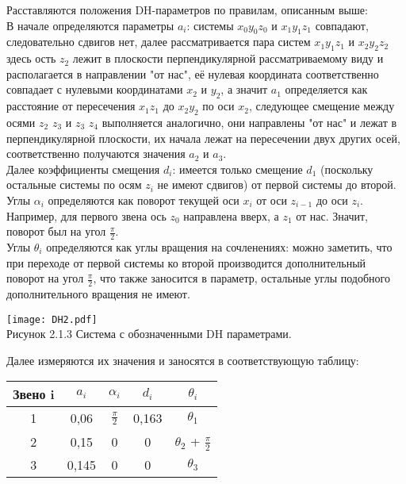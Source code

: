\hspace*{\parindent}Расставляются положения DH-параметров по правилам, описанным выше:\\ 
\hspace*{\parindent}В начале определяются параметры $a_i$: системы $x_0y_0z_0$ и $x_1y_1z_1$ совпадают, следовательно сдвигов нет, далее рассматривается пара систем $x_1y_1z_1$ и $x_2y_2z_2$ здесь ость $z_2$ лежит в плоскости перпендикулярной рассматриваемому виду и располагается в направлении "от нас", её нулевая координата соответственно совпадает с нулевыми координатами $x_2$ и $y_2$, а значит $a_1$ определяется как расстояние от пересечения $x_1z_1$ до  $x_2y_2$ по оси $x_2$, следующее смещение между осями $z_2$ $z_3$ и $z_3$ $z_4$ выполняется аналогично, они направлены "от нас" и лежат в перпендикулярной плоскости, их начала лежат на пересечении двух других осей, соответственно получаются значения $a_2$ и $a_3$.\\
\hspace*{\parindent}Далее коэффициенты смещения $d_i$: имеется только смещение $d_1$ (поскольку остальные системы по осям $z_i$ не имеют сдвигов) от первой системы до второй.\\
Углы $\alpha_i$ определяются как поворот текущей оси $x_i$ от оси $z_{i-1}$ до оси $z_{i}$. Например, для первого звена ось $z_0$ направлена вверх, а $z_1$ от нас. Значит, поворот был на угол $\frac{\pi}{2}$. \\
\hspace*{\parindent}Углы $\theta_i$ определяются как углы вращения на сочленениях: можно заметить, что при переходе от первой системы ко второй производится дополнительный поворот на угол $\frac{\pi}{2}$, что также заносится в параметр, остальные углы подобного дополнительного вращения не имеют.\\
\begin{center}
    \texttt{[image: DH2.pdf]}\\
    Рисунок 2.1.3 Система с обозначенными DH параметрами.\\
\end{center}



\begin{table}[h!]
\hspace*{\parindent}Далее измеряются их значения и заносятся в соответствующую таблицу:\\
\begin{center}
\begin{tabular}{|c|c|c|c|c|}
\hline
Звено i & $a_i$ & $\alpha_i$ & $d_i$ & $\theta_i$ \\
\hline
1 & 0,06 & $\frac{\pi}{2}$ & 0,163 & $\theta_1$\\
\hline
2 & 0,15 & 0 & 0 & $\theta_2$ + $\frac{\pi}{2}$\\
\hline
3 & 0,145 & 0 & 0 & $\theta_3$\\
\hline
\end{tabular}
\end{center}
\end{table} 

